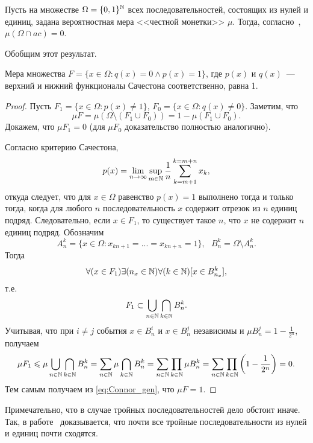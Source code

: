 Пусть на множестве $\Omega=\{0,1\}^{\mathbb{N}}$ всех последовательностей, состоящих из нулей и единиц,
задана вероятностная мера <<честной монетки>> $\mu$.
Тогда, согласно~\cite{connor1990almost}, $\mu(\Omega\cap ac)=0$.

Обобщим этот результат.
\begin{theorem}
	\label{thm:Connor_generalized}
	Мера множества $F=\{x\in\Omega : q(x) = 0 \wedge p(x)= 1\}$,
	где $p(x)$ и $q(x)$~--- верхний и нижний функционалы Сачестона соответственно,
	равна 1.
\end{theorem}

\begin{proof}
	Пусть $F_1=\{x\in\Omega : p(x) \neq 1\}$, $F_0=\{x\in\Omega : q(x) \neq 0\}$.
	Заметим, что
	\begin{equation}
		\label{eq:Connor_gen}
		\mu F = \mu (\Omega\setminus(F_1 \cup F_0)) = 1 - \mu (F_1 \cup F_0)
		.
	\end{equation}
	Докажем, что $\mu F_1 = 0 $	(для $\mu F_0$  доказательство полностью аналогично).

	Согласно критерию Сачестона,
	\begin{equation}
		p(x) = \lim_{n\to\infty} \sup_{m\in\mathbb{N}} \frac{1}{n} \sum_{k=m+1}^{k=m+n} x_k
		,
	\end{equation}
	откуда следует, что
	для $x\in\Omega$ равенство $p(x) = 1$ выполнено тогда и только тогда,
	когда для любого $n$ последовательность $x$ содержит отрезок из $n$ единиц подряд.
%
	Следовательно, если $x\in F_1$,
	то существует такое $n$,
	что $x$ не содержит $n$ единиц подряд.
%
%
	Обозначим
	\begin{equation}
		A_n^k = \{x\in\Omega : x_{kn+1} = ... = x_{kn+n} = 1\}
		,
		~~~
		B_n^k = \Omega \setminus A_n^k
		.
	\end{equation}
	Тогда
	\begin{equation}
		\forall(x\in F_1)\exists(n_x\in\mathbb{N})\forall(k\in\mathbb{N})[x\in B_{n_x}^k]
		,
	\end{equation}
	т.е.
	\begin{equation}
		F_1 \subset \bigcup_{n\in\mathbb{N}} \bigcap_{k\in\mathbb{N}} B_{n}^k
		.
	\end{equation}
	Учитывая, что при $i\neq j$ события $x\in B_n^i$ и $x\in B_n^j$ независимы и $\mu B_n^j = 1-\frac{1}{2^n}$,
	получаем
	\begin{multline}
		\mu F_1 \leqslant \mu \bigcup_{n\in\mathbb{N}} \bigcap_{k\in\mathbb{N}} B_{n}^k
		=
		\sum_{n\in\mathbb{N}} \mu \bigcap_{k\in\mathbb{N}} B_{n}^k
		=
		\sum_{n\in\mathbb{N}}  \prod_{k\in\mathbb{N}} \mu B_{n}^k
		=
		\sum_{n\in\mathbb{N}}  \prod_{k\in\mathbb{N}} \left( 1-\frac{1}{2^n} \right)
		=0
		.
	\end{multline}
	Тем самым получаем из \eqref{eq:Connor_gen}, что $\mu F = 1$.
\end{proof}

\begin{remark}
	Примечательно, что в случае тройных последовательностей дело обстоит иначе.
	Так, в работе~\cite{esi2014almost} доказывается, что почти все тройные последовательности из нулей и единиц почти сходятся.
\end{remark}
